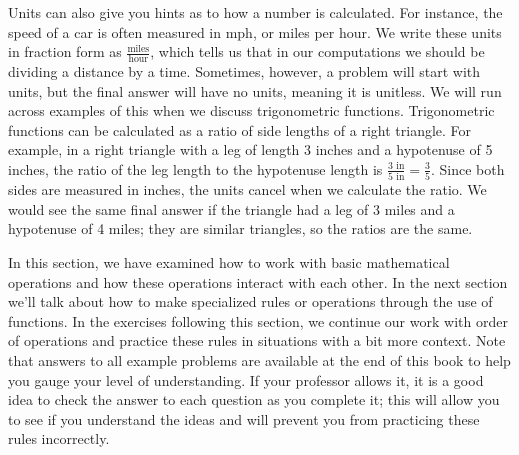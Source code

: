Units can also give you hints as to how a number is calculated. For instance, the speed of a car is often measured in mph, or miles per hour. We write these units in fraction form as $\frac{\text{miles}}{\text{hour}}$, which tells us that in our computations we should be dividing a distance by a time. Sometimes, however, a problem will start with units, but the final answer will have no units, meaning it is unitless. We will run across examples of this when we discuss trigonometric functions. Trigonometric functions can be calculated as a ratio of side lengths of a right triangle. For example, in a right triangle with a leg of length 3 inches and a hypotenuse of 5 inches, the ratio of the leg length to the hypotenuse length is $\frac{3 \text{ in}}{5 \text{ in}}=\frac{3}{5}$. Since both sides are measured in inches, the units cancel when we calculate the ratio. We would see the same final answer if the triangle had a leg of 3 miles and a hypotenuse of 4 miles; they are similar triangles, so the ratios are the same.

In this section, we have examined how to work with basic mathematical operations and how these operations interact with each other. In the next section we'll talk about how to make specialized rules or operations through the use of functions. In the exercises following this section, we continue our work with order of operations and practice these rules in situations with a bit more context. Note that answers to all example problems are available at the end of this book to help you gauge your level of understanding. If your professor allows it, it is a good idea to check the answer to each question as you complete it; this will allow you to see if you understand the ideas and will prevent you from practicing these rules incorrectly.\\



